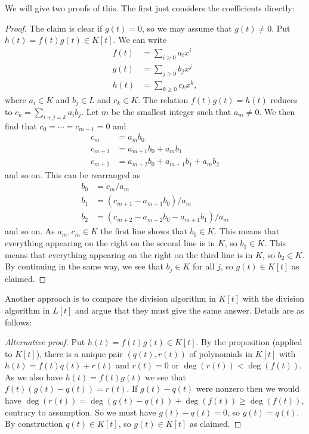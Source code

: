 \documentclass{amsart}
\renewcommand{\:}{\colon}
\theoremstyle{definition}
\begin{document}
We will give two proofs of this.  The first just considers the
coefficients directly: 
\begin{proof}
 The claim is clear if $g(t)=0$, so we may assume that $g(t)\neq 0$.
 Put $h(t)=f(t)g(t)\in K[t]$.   We can write  
 \begin{align*}
  f(t) &= \sum_{i\geq 0} a_i x^i \\
  g(t) &= \sum_{j\geq 0} b_j x^j \\
  h(t) &= \sum_{k\geq 0} c_k x^k,
 \end{align*}
 where $a_i\in K$ and $b_j\in L$ and $c_k\in K$.  The relation
 $f(t)g(t)=h(t)$ reduces to $c_k=\sum_{i+j=k}a_ib_j$.  Let $m$ be the
 smallest integer such that $a_m\neq 0$.  We then find that
 $c_0=\dotsb=c_{m-1}=0$ and 
 \begin{align*}
  c_m &= a_mb_0 \\
  c_{m+1} &= a_{m+1}b_0+a_mb_1 \\
  c_{m+2} &= a_{m+2}b_0+a_{m+1}b_1+a_mb_2 
 \end{align*}
 and so on.  This can be rearranged as
 \begin{align*}
  b_0 &= c_m/a_m \\
  b_1 &= (c_{m+1}-a_{m+1}b_0)/a_m \\
  b_2 &= (c_{m+2}-a_{m+2}b_0-a_{m+1}b_1)/a_m 
 \end{align*}
 and so on.  As $a_m,c_m\in K$ the first line shows that $b_0\in K$.
 This means that everything appearing on the right on the second line
 is in $K$, so $b_1\in K$.  This means that everything appearing on
 the right on the third line is in $K$, so $b_2\in K$.  By continuing
 in the same way, we see that $b_j\in K$ for all $j$, so
 $g(t)\in K[t]$ as claimed.
\end{proof}

Another approach is to compare the division algorithm in $K[t]$ with
the division algorithm in $L[t]$ and argue that they must give the
same answer.  Details are as follows:
\begin{proof}[Alternative proof]
 Put $h(t)=f(t)g(t)\in K[t]$.  By the proposition (applied to $K[t]$),
 there is a unique pair $(q(t),r(t))$ of polynomials in $K[t]$ with
 $h(t)=f(t)q(t)+r(t)$ and $r(t)=0$ or $\deg(r(t))<\deg(f(t))$.  As we
 also have $h(t)=f(t)g(t)$ we see that $f(t)(g(t)-q(t))=r(t)$.  If
 $g(t)-q(t)$ were nonzero then we would have
 $\deg(r(t))=\deg(g(t)-q(t))+\deg(f(t))\geq\deg(f(t))$, contrary to
 assumption.  So we must have $g(t)-q(t)=0$, so $g(t)=q(t)$.  By
 construction $q(t)\in K[t]$, so $g(t)\in K[t]$ as claimed.
\end{proof}
\end{document}
